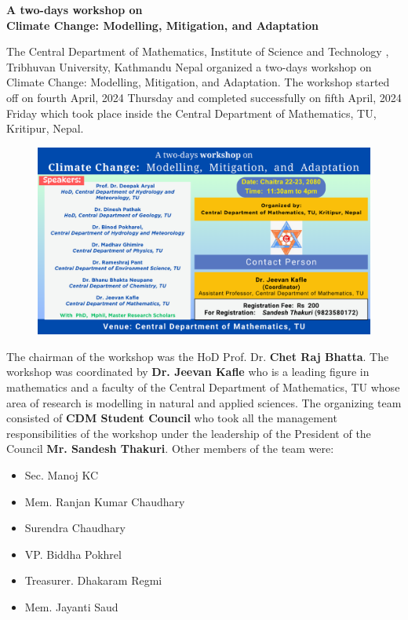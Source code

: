 \documentclass[a4paper,12pt]{report}
\begin{document}
\begin{center}
 \bfseries \Large A two-days workshop on \\
  Climate Change:  Modelling,  Mitigation,  and  Adaptation
\end{center}
\vspace{5mm}
The Central Department of Mathematics, Institute of Science and Technology , Tribhuvan University, Kathmandu Nepal organized a two-days workshop on Climate Change:  Modelling,  Mitigation, and  Adaptation. The workshop started off on fourth April, 2024 Thursday and completed successfully on fifth  April, 2024 Friday which took place inside the Central Department of Mathematics, TU, Kritipur, Nepal.
\vspace{5mm}

\begin{figure}[h!]
  \centering
  \includegraphics[scale=0.33]{workshop_climatechange.png}
\end{figure}
\vspace{5mm}
\noindent
The chairman of the workshop was the HoD Prof. Dr. \textbf{Chet Raj Bhatta}. The workshop was coordinated by \textbf{Dr. Jeevan Kafle} who is a leading figure in mathematics and a faculty of the Central Department of Mathematics, TU whose area of research is modelling in natural and applied sciences. The organizing team consisted of \textbf{CDM Student Council} who took all the management responsibilities of the workshop under the leadership of the President of the Council \textbf{Mr. Sandesh Thakuri}. Other members of the team were:
\vspace{10mm}

\begin{minipage}{0.45\textwidth}
 \begin{itemize}
\item Sec. Manoj KC
\item Mem. Ranjan Kumar Chaudhary
\item Surendra Chaudhary
\end{itemize}
\end{minipage}\hspace{3mm}
\begin{minipage}{0.45\textwidth}
\begin{itemize}
\item VP. Biddha Pokhrel
\item Treasurer. Dhakaram Regmi
\item Mem. Jayanti Saud
\end{itemize}
\end{minipage}
\end{document}
